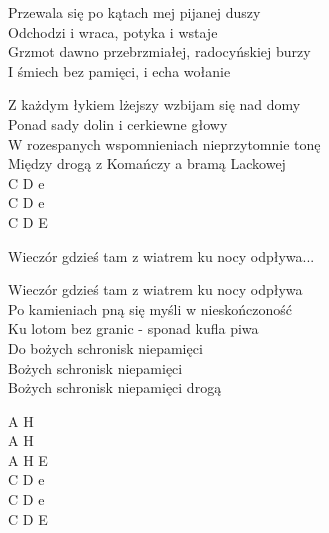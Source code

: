 \documentclass{report}
\begin{document}
\begin{paracol}{2}
Przewala się po kątach mej pijanej duszy\\
Odchodzi i wraca, potyka i wstaje\\
Grzmot dawno przebrzmiałej, radocyńskiej burzy\\
I śmiech bez pamięci, i echa wołanie\\

\switchcolumn

\end{paracol}
\begin{paracol}{2}
Z każdym łykiem lżejszy wzbijam się nad domy\\
Ponad sady dolin i cerkiewne głowy\\
W rozespanych wspomnieniach nieprzytomnie tonę\\
Między drogą z Komańczy a bramą Lackowej\\

\switchcolumn
\vspace{\baselineskip}
\vspace{\baselineskip}
\vspace{\baselineskip}
C D e\\
C D e\\
C D E\\

\end{paracol}
\begin{paracol}{2}
\begin{chorus}
Wieczór gdzieś tam z wiatrem ku nocy odpływa...\\
\end{chorus}

\switchcolumn

\end{paracol}
\begin{paracol}{2}
\begin{chorus}
Wieczór gdzieś tam z wiatrem ku nocy odpływa\\
Po kamieniach pną się myśli w nieskończoność\\
Ku lotom bez granic - sponad kufla piwa\\
Do bożych schronisk niepamięci\\
Bożych schronisk niepamięci\\
Bożych schronisk niepamięci drogą\\
\end{chorus}

\switchcolumn
\vspace{\baselineskip}
\vspace{\baselineskip}
\vspace{\baselineskip}
A H\\
A H\\
A H E\\
C D e\\
C D e\\
C D E\\
\vspace{\baselineskip}
\vspace{\baselineskip}

\end{paracol}
\newpage
\end{document}
